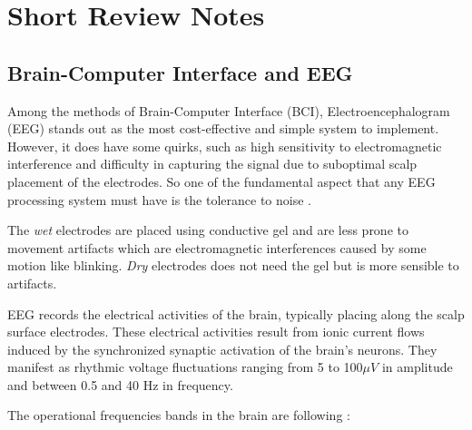 \section{Short Review Notes}
	\label{sec:revBibli}
	
	\subsection{Brain-Computer Interface and EEG}
		\par Among the methods of Brain-Computer Interface (BCI), Electroencephalogram (EEG) stands out as the most cost-effective and simple system to implement. However, it does have some quirks, such as high sensitivity to electromagnetic interference and difficulty in capturing the signal due to suboptimal scalp placement of the electrodes. So one of the fundamental aspect that any EEG processing system must have is the tolerance to noise \cite{JALALYBIDGOLY2020101788}.
		
		\par The \textit{wet} electrodes are placed using conductive gel and are less prone to movement artifacts which are electromagnetic interferences caused by some motion like blinking. \textit{Dry} electrodes does not need the gel but is more sensible to artifacts.
		
		\par EEG records the electrical activities of the brain, typically placing along the scalp surface electrodes. These electrical activities result from ionic current flows induced by the synchronized synaptic activation of the brain's neurons. They manifest as rhythmic voltage fluctuations ranging from 5 to 100$\mu V$ in amplitude and between 0.5 and 40 Hz in frequency\cite{JALALYBIDGOLY2020101788}.

		\par The operational frequencies bands in the brain are following \cite{sanei2021eeg}:
		
